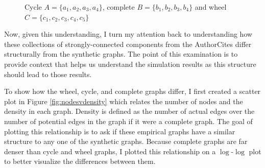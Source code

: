 \begin{figure}
    \centering
    \caption{Cycle $A = \{ a_1, a_2, a_3, a_4\}$, complete $B = \{ b_1, b_2, b_3, b_4 \}$ and wheel $C = \{ c_1, c_2, c_3, c_4, c_5 \}$}
    \label{fig:4}
\end{figure}

Now, given this understanding, I turn my attention back to understanding
how these collections of strongly-connected components from the
AuthorCites differ structurally from the synthetic graphs. The point of
this examination is to provide context that helps us understand the
simulation results as this structure should lead to those results.

To show how the wheel, cycle, and complete graphs differ, I first
created a scatter plot in Figure \ref{fig:nodesvdensity} which relates
the number of nodes and the density in each graph. Density is defined as
the number of actual edges over the number of potential edges in the
graph if it were a complete graph. The goal of plotting this
relationship is to ask if these empirical graphs have a similar
structure to any one of the synthetic graphs. Because complete graphs
are far denser than cycle and wheel graphs, I plotted this relationship
on a \(\log\)-\(\log\) plot to better visualize the differences between
them.

